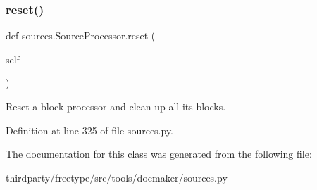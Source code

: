 \subsubsection{\texorpdfstring{reset()}{reset()}}
{\footnotesize\ttfamily def sources.\+Source\+Processor.\+reset (\begin{DoxyParamCaption}\item[{}]{self }\end{DoxyParamCaption})}

\begin{DoxyVerb}Reset a block processor and clean up all its blocks.\end{DoxyVerb}
 

Definition at line 325 of file sources.\+py.



The documentation for this class was generated from the following file\+:\begin{DoxyCompactItemize}
\item 
thirdparty/freetype/src/tools/docmaker/sources.\+py\end{DoxyCompactItemize}
